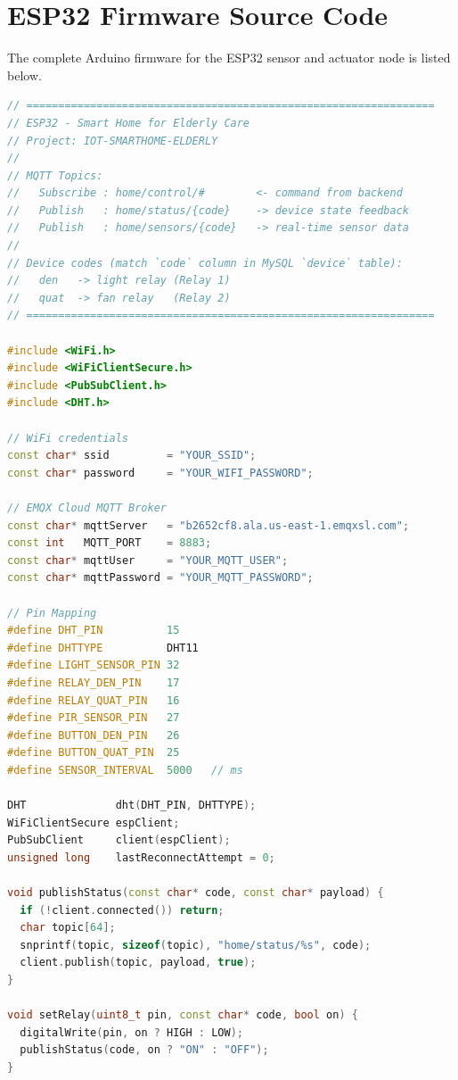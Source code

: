\chapter{ESP32 Firmware Source Code}

The complete Arduino firmware for the ESP32 sensor and actuator node is listed below.

\begin{lstlisting}[style=mystyle, language=C++, caption={ESP32.ino --- complete firmware source code}, label={lst:esp32}]
// ================================================================
// ESP32 - Smart Home for Elderly Care
// Project: IOT-SMARTHOME-ELDERLY
//
// MQTT Topics:
//   Subscribe : home/control/#        <- command from backend
//   Publish   : home/status/{code}    -> device state feedback
//   Publish   : home/sensors/{code}   -> real-time sensor data
//
// Device codes (match `code` column in MySQL `device` table):
//   den   -> light relay (Relay 1)
//   quat  -> fan relay   (Relay 2)
// ================================================================

#include <WiFi.h>
#include <WiFiClientSecure.h>
#include <PubSubClient.h>
#include <DHT.h>

// WiFi credentials
const char* ssid         = "YOUR_SSID";
const char* password     = "YOUR_WIFI_PASSWORD";

// EMQX Cloud MQTT Broker
const char* mqttServer   = "b2652cf8.ala.us-east-1.emqxsl.com";
const int   MQTT_PORT    = 8883;
const char* mqttUser     = "YOUR_MQTT_USER";
const char* mqttPassword = "YOUR_MQTT_PASSWORD";

// Pin Mapping
#define DHT_PIN          15
#define DHTTYPE          DHT11
#define LIGHT_SENSOR_PIN 32
#define RELAY_DEN_PIN    17
#define RELAY_QUAT_PIN   16
#define PIR_SENSOR_PIN   27
#define BUTTON_DEN_PIN   26
#define BUTTON_QUAT_PIN  25
#define SENSOR_INTERVAL  5000   // ms

DHT              dht(DHT_PIN, DHTTYPE);
WiFiClientSecure espClient;
PubSubClient     client(espClient);
unsigned long    lastReconnectAttempt = 0;

void publishStatus(const char* code, const char* payload) {
  if (!client.connected()) return;
  char topic[64];
  snprintf(topic, sizeof(topic), "home/status/%s", code);
  client.publish(topic, payload, true);
}

void setRelay(uint8_t pin, const char* code, bool on) {
  digitalWrite(pin, on ? HIGH : LOW);
  publishStatus(code, on ? "ON" : "OFF");
}


\end{lstlisting}

